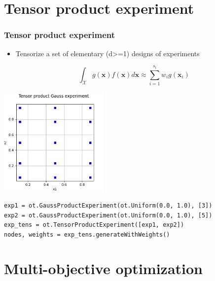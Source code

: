 \documentclass{beamer}
\begin{document}
\section{Tensor product experiment}

\begin{frame}[containsverbatim]
\frametitle{Tensor product experiment}

\begin{itemize}
\item Tensorize a set of elementary (d>=1) designs of experiments

$$
\int_{\mathcal{X}} g(\boldsymbol{x}) f(\boldsymbol{x}) d\boldsymbol{x} 
    \approx \sum_{i = 1}^{s_t} w_i g\left(\boldsymbol{x}_i\right)
$$

\end{itemize}


\begin{center}
\includegraphics[width=0.4\textwidth]{figures/TensorProductExperiment.png}
\end{center}

\lstset{language=python}
\begin{lstlisting}
exp1 = ot.GaussProductExperiment(ot.Uniform(0.0, 1.0), [3])
exp2 = ot.GaussProductExperiment(ot.Uniform(0.0, 1.0), [5])
exp_tens = ot.TensorProductExperiment([exp1, exp2])
nodes, weights = exp_tens.generateWithWeights()
\end{lstlisting}

\end{frame}


\section{Multi-objective optimization}
\end{document}
